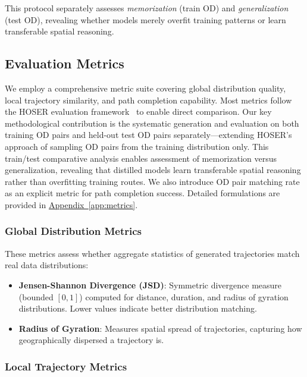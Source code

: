 This protocol separately assesses \emph{memorization} (train OD) and \emph{generalization} (test OD), revealing whether models merely overfit training patterns or learn transferable spatial reasoning.

\subsection{Evaluation Metrics}
\label{sec:eval-metrics}

We employ a comprehensive metric suite covering global distribution quality, local trajectory similarity, and path completion capability. Most metrics follow the HOSER evaluation framework~\cite{caoHolisticSemanticRepresentation2025,HOSEREvaluationMainipynb} to enable direct comparison. Our key methodological contribution is the systematic generation and evaluation on both training OD pairs and held-out test OD pairs separately---extending HOSER's approach of sampling OD pairs from the training distribution only. This train/test comparative analysis enables assessment of memorization versus generalization, revealing that distilled models learn transferable spatial reasoning rather than overfitting training routes. We also introduce OD pair matching rate as an explicit metric for path completion success. Detailed formulations are provided in \hyperref[app:metrics]{Appendix~\ref*{app:metrics}}.

\subsubsection{Global Distribution Metrics}

These metrics assess whether aggregate statistics of generated trajectories match real data distributions:

\begin{itemize}[noitemsep,topsep=0pt]
    \item \textbf{Jensen-Shannon Divergence (JSD)}: Symmetric divergence measure (bounded $[0, 1]$) computed for distance, duration, and radius of gyration distributions. Lower values indicate better distribution matching.
    \item \textbf{Radius of Gyration}: Measures spatial spread of trajectories, capturing how geographically dispersed a trajectory is.
\end{itemize}

\subsubsection{Local Trajectory Metrics}

